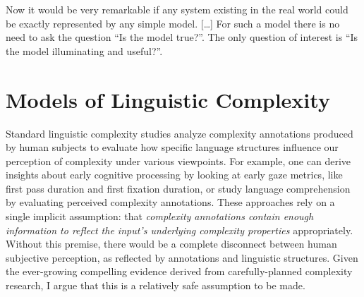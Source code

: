 \documentclass[a4paper, nobind]{templates/ociamthesis}
\begin{document}
\titlespacing{\chapter}{0pt}{0pt}{35pt}

\begin{savequote}
Now it would be very remarkable if any system existing in the real world
could be exactly represented by any simple model. {[}\ldots{}{]} For
such a model there is no need to ask the question ``Is the model
true?''. The only question of interest is ``Is the model illuminating
and useful?''.
\end{savequote}



\titlespacing*{\chapter}{0pt}{80px}{35pt}

\hypertarget{chap:models}{%
\chapter{\texorpdfstring{\textbf{Models of Linguistic Complexity}}{Models of Linguistic Complexity}}\label{chap:models}}

\minitoc 


Standard linguistic complexity studies analyze complexity annotations produced by human subjects to evaluate how specific language structures influence our perception of complexity under various viewpoints. For example, one can derive insights about early cognitive processing by looking at early gaze metrics, like first pass duration and first fixation duration, or study language comprehension by evaluating perceived complexity annotations. These approaches rely on a single implicit assumption: that \emph{complexity annotations contain enough information to reflect the input's underlying complexity properties} appropriately. Without this premise, there would be a complete disconnect between human subjective perception, as reflected by annotations and linguistic structures. Given the ever-growing compelling evidence derived from carefully-planned complexity research, I argue that this is a relatively safe assumption to be made.
\end{document}
